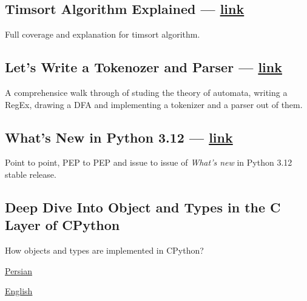 \begin{multicols}{2}
\subsection{{Timsort Algorithm Explained --- \href{https://virgool.io/@liewpl/timsort-algorithm-explained-u41h0wv0jnax}{link}}}
\begin{zitemize}
\item Full coverage and explanation for {\ttfamily timsort} algorithm.
\end{zitemize}

\subsection{{Let's Write a Tokenozer and Parser --- \href{https://virgool.io/@liewpl/tokenizer-parser-in-python-ubzlsvukmdxz}{link}}}
\begin{zitemize}
\item A comprehensice walk through of studing the theory of automata, writing a RegEx, drawing a DFA and implementing a tokenizer and a parser out of them.
\end{zitemize}

\subsection{{What's New in Python 3.12 --- \href{https://virgool.io/@liewpl/python-3-12-whats-new-vpq99njtytc6}{link}}}
\begin{zitemize}
\item Point to point, PEP to PEP and issue to issue of \textit{What's new} in Python 3.12 stable release.
\end{zitemize}

\subsection{{Deep Dive Into Object and Types in the C Layer of CPython}}
\begin{zitemize}
\item How objects and types are implemented in CPython?
\item \href{https://virgool.io/@liewpl/cpython-objs-types-c-layer-deep-dive-m5fjelhzrzny}{Persian}
\item \href{https://virgool.io/@liewpl/cpython-objs-types-c-layer-deep-dive-m5fjelhzrzny}{English}
\end{zitemize}


\end{multicols}

